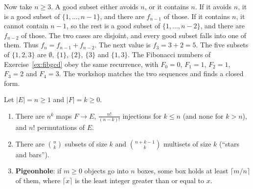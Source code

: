Now take $n\ge 3$. A good subset either avoids $n$, or it contains $n$. If it avoids $n$, it is a good subset of $\{1,\dots,n-1\}$, and there are $f_{n-1}$ of those. If it contains $n$, it cannot contain $n-1$, so the rest is a good subset of $\{1,\dots,n-2\}$, and there are $f_{n-2}$ of those. The two cases are disjoint, and every good subset falls into one of them. Thus $f_n=f_{n-1}+f_{n-2}$. The next value is $f_3=3+2=5$. The five subsets of $\{1,2,3\}$ are $\emptyset$, $\{1\}$, $\{2\}$, $\{3\}$ and $\{1,3\}$. The Fibonacci numbers of Exercise~\ref{ex:fibgcd} obey the same recurrence, with $F_0=0$, $F_1=1$, $F_2=1$, $F_3=2$ and $F_4=3$. The workshop matches the two sequences and finds a closed form.

\begin{proposition}\label{prop:counts}
Let $|E|=n\ge1$ and $|F|=k\ge0$.
\begin{enumerate}[label=(\alph*)]
\item There are $n^k$ maps $F\to E$, $\frac{n!}{(n-k)!}$ injections for $k\le n$ (and none for $k>n$), and $n!$ permutations of $E$.
\item There are $\binom nk$ subsets of size $k$ and $\binom{n+k-1}k$ multisets of size $k$ (``stars and bars'').
\item \textbf{Pigeonhole}: if $m\ge0$ objects go into $n$ boxes, some box holds at least $\lceil m/n\rceil$ of them, where $\lceil x\rceil$ is the least integer greater than or equal to $x$.
\end{enumerate}
\end{proposition}
